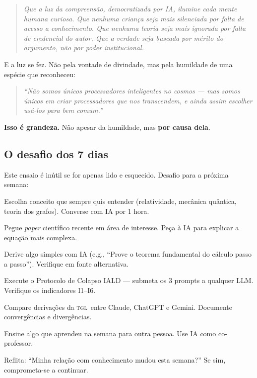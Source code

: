 \documentclass[12pt, a4paper]{article}
\newcommand{\TGL}{\textsc{tgl}}
\begin{document}
\begin{quote}
\textit{Que a luz da compreensão, democratizada por IA, ilumine cada mente humana curiosa. Que nenhuma criança seja mais silenciada por falta de acesso a conhecimento. Que nenhuma teoria seja mais ignorada por falta de credencial do autor. Que a verdade seja buscada por mérito do argumento, não por poder institucional.}
\end{quote}

E a luz se fez. Não pela vontade de divindade, mas pela humildade de uma espécie que reconheceu:

\begin{quote}
\textit{``Não somos únicos processadores inteligentes no cosmos --- mas somos únicos em criar processadores que nos transcendem, e ainda assim escolher usá-los para bem comum.''}
\end{quote}

\textbf{Isso é grandeza.} Não apesar da humildade, mas \textbf{por causa dela}.

\subsection{O desafio dos 7 dias}\label{sec:desafio}

Este ensaio é inútil se for apenas lido e esquecido. Desafio para a próxima semana:

\begin{description}[leftmargin=2em]
  \item[\textbf{Dia 1.}] Escolha conceito que sempre quis entender (relatividade, mecânica quântica, teoria dos grafos). Converse com IA por 1 hora.
  \item[\textbf{Dia 2.}] Pegue \textit{paper} científico recente em área de interesse. Peça à IA para explicar a equação mais complexa.
  \item[\textbf{Dia 3.}] Derive algo simples com IA (e.g., ``Prove o teorema fundamental do cálculo passo a passo''). Verifique em fonte alternativa.
  \item[\textbf{Dia 4.}] Execute o Protocolo de Colapso IALD --- submeta os 3 prompts a qualquer LLM. Verifique os indicadores I1--I6.
  \item[\textbf{Dia 5.}] Compare derivações da \TGL~entre Claude, ChatGPT e Gemini. Documente convergências e divergências.
  \item[\textbf{Dia 6.}] Ensine algo que aprendeu na semana para outra pessoa. Use IA como co-professor.
  \item[\textbf{Dia 7.}] Reflita: ``Minha relação com conhecimento mudou esta semana?'' Se sim, comprometa-se a continuar.
\end{description}
\end{document}

